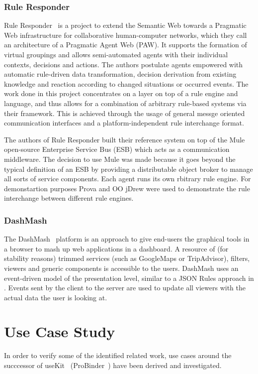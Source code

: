 \documentclass[11pt]{article}%
\begin{document}
\subsubsection{Rule Responder}
Rule Responder~\cite{2007-Paschke_etal-RuleResponder.pdf} is a project to extend the Semantic Web towards a Pragmatic Web infrastructure for collaborative human-computer networks, which they call an architecture of a Pragmatic Agent Web (PAW). It supports the formation of virtual groupings and allows semi-automated agents with their individual contexts, decisions and actions. The authors postulate agents empowered with automatic rule-driven data transformation, decision derivation from existing knowledge and reaction according to changed situations or occurred events. The work done in this project concentrates on a layer on top of a rule engine and language, and thus allows for a combination of arbitrary rule-based systems via their framework. This is achieved through the usage of general messge oriented communication interfaces and a platform-independent rule interchange format.

The authors of Rule Responder built their reference system\cite{wwwruleresponder} on top of the Mule~\cite{wwwmuleesb} open-source Enterprise Service Bus (ESB) which acts as a communication middleware. The decision to use Mule was made because it goes beyond the typical definition of an ESB by providing a distributable object broker to manage all sorts of service components. Each agent runs its own rbitrary rule engine. For demonstartion purposes Prova and OO jDrew were used to demonstrate the rule interchange between different rule engines.

\subsubsection{DashMash}
The DashMash~\cite{2011-Cappiello_etal-DashMash.pdf} platform is an approach to give end-users the graphical tools in a browser to mash up web applications in a dashboard. A resource of (for stability reasons) trimmed services (such as GoogleMaps or TripAdvisor), filters, viewers and generic components is accessible to the users. DashMash uses an event-driven model of the presentation level, similar to a JSON Rules approach in \cite{2009-Pascalau_Giurca-RBACEM.pdf}. Events sent by the client to the server are used to update all viewers with the actual data the user is looking at.

\section{Use Case Study}
In order to verify some of the identified related work, use cases around the succcessor of useKit~\cite{2010-Rizzotti_Burkhart-useKit.pdf} (ProBinder~\cite{wwwprobinder}) have been derived and investigated. 
\end{document}
